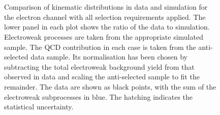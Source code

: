 \begin{figure}[h!]
\centering
{}
\\
\\
\caption{Comparison of kinematic distributions in data and simulation for the
  electron channel with all selection requirements applied. The lower panel in
  each plot shows the ratio of the data to simulation. Electroweak processes are
  taken from the appropriate simulated sample. The \ac{QCD} contribution in each
  case is taken from the anti-selected data sample. Its normalisation has been
  chosen by subtracting the total electroweak background yield from that
  observed in data and scaling the anti-selected sample to fit the
  remainder. The data are shown as black points, with the sum of the electroweak
  subprocesses in blue. The hatching indicates the statistical uncertainty.}
\label{fig:wpol_datamc_ele}
\end{figure}

